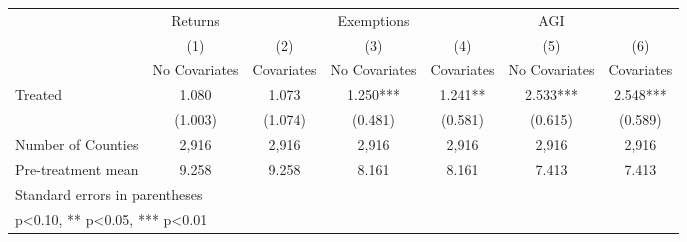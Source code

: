{
\def\sym#1{\ifmmode^{#1}\else\(^{#1}\)\fi}
\begin{tabular}{l*{6}{c}}
\hline\hline
            &     Returns   &               &  Exemptions   &               &         AGI   &               \\
            &\multicolumn{1}{c}{(1)}&\multicolumn{1}{c}{(2)}&\multicolumn{1}{c}{(3)}&\multicolumn{1}{c}{(4)}&\multicolumn{1}{c}{(5)}&\multicolumn{1}{c}{(6)}\\
            &\multicolumn{1}{c}{No Covariates}&\multicolumn{1}{c}{Covariates}&\multicolumn{1}{c}{No Covariates}&\multicolumn{1}{c}{Covariates}&\multicolumn{1}{c}{No Covariates}&\multicolumn{1}{c}{Covariates}\\
\hline
Treated     &       1.080   &       1.073   &       1.250***&       1.241** &       2.533***&       2.548***\\
            &     (1.003)   &     (1.074)   &     (0.481)   &     (0.581)   &     (0.615)   &     (0.589)   \\
\hline
Number of Counties&       2,916   &       2,916   &       2,916   &       2,916   &       2,916   &       2,916   \\
Pre-treatment mean&       9.258   &       9.258   &       8.161   &       8.161   &       7.413   &       7.413   \\
\hline\hline
\multicolumn{7}{l}{\footnotesize Standard errors in parentheses}\\
\multicolumn{7}{l}{\footnotesize * p<0.10, ** p<0.05, *** p<0.01}\\
\end{tabular}
}

